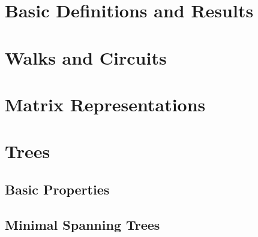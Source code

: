 \section{Basic Definitions and Results}

\section{Walks and Circuits}

\section{Matrix Representations}

\section{Trees}
    \subsection{Basic Properties}
    \subsection{Minimal Spanning Trees}